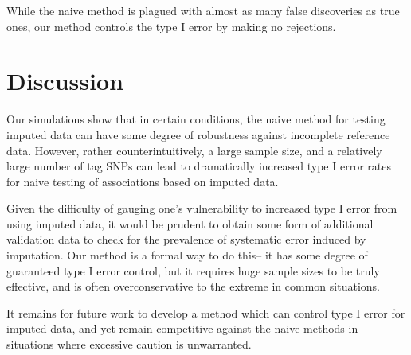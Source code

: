 \documentclass[12pt]{article}
\begin{document}
While the naive method is plagued with almost as many false
discoveries as true ones,
our method controls the type I error by making no rejections.

\section{Discussion}

Our simulations show that in certain conditions,
the naive method for testing imputed data can
have some degree of robustness against incomplete reference data.
However, rather counterintuitively, a large sample size,
and a relatively large number of tag SNPs can lead to dramatically
increased type I error rates for naive testing of associations
based on imputed data.

Given the difficulty of gauging one's vulnerability
to increased type I error from using imputed data,
it would be prudent to obtain some form of additional validation data
to check for the prevalence of systematic error induced by imputation.
Our method is a formal way to do this--
it has some degree of guaranteed type I error control,
but it requires huge sample sizes to be truly effective, and
is often overconservative to the extreme in common situations.

It remains for future work to develop a method which can control
type I error for imputed data, and yet remain competitive against
the naive methods in situations where excessive caution is unwarranted.



\end{document}
